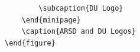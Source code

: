 \begin{verbatim}
        \subcaption{DU Logo}
    \end{minipage}
    \caption{ARSD and DU Logos}
\end{figure}
\end{verbatim}


